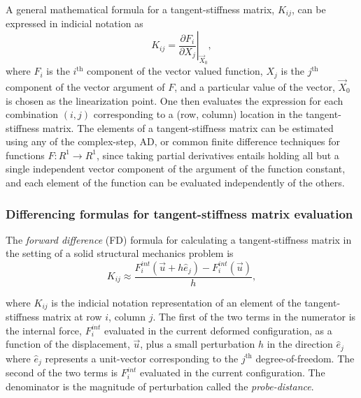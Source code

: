 \documentclass[preprint,12pt]{elsarticle}
\begin{document}
A general mathematical formula for a tangent-stiffness matrix, $K_{ij}$, can be
expressed in indicial notation as 
%
\begin{equation} K_{ij} = \left. \frac{\partial F_i}{\partial
X_j}\right|_{\vec{X}_0}, \end{equation}
%
where $F_i$ is the $i^{\mbox{th}}$ component of the vector valued function,
$X_j$ is the $j^{\mbox{th}}$ component of the vector argument of $F$, and a
particular value of the vector, $\vec{X}_0$ is chosen as the linearization
point. One then evaluates the expression for each combination $(i, j)$
corresponding to a (row, column) location in the tangent-stiffness matrix. The
elements of a tangent-stiffness matrix can be estimated using any of the
complex-step, AD, or common finite difference techniques for functions $F:R^1
\rightarrow R^1$, since taking partial derivatives entails holding all but a
single independent vector component of the argument of the function constant, and each element
of the function can be evaluated independently of the others. \\ 

\subsubsection{Differencing formulas for tangent-stiffness matrix evaluation}

The \emph{forward difference} (FD) formula for calculating a tangent-stiffness matrix in the setting of a solid structural mechanics problem is 
%
\begin{equation} 
  K_{ij} \approx \frac{F_i^{int}(\vec{u} + h \hat{e}_j) - F_i^{int}(\vec{u})}{h},
\end{equation}
%

where $K_{ij}$ is the indicial notation representation of an element of the
tangent-stiffness matrix at row $i$, column $j$. The first of the two terms in
the numerator is the internal force, $F_i^{int}$ evaluated in the current
deformed configuration, as a function of the displacement, $\vec{u}$,  plus a small perturbation $h$ in the
direction $\hat{e}_j$ where $\hat{e}_j$ represents a unit-vector corresponding
to the $j^{\mbox{th}}$ degree-of-freedom. The second of the two terms is
$F_i^{int}$ evaluated in the current configuration. The denominator is the
magnitude of perturbation called the \emph{probe-distance}.
\end{document}
